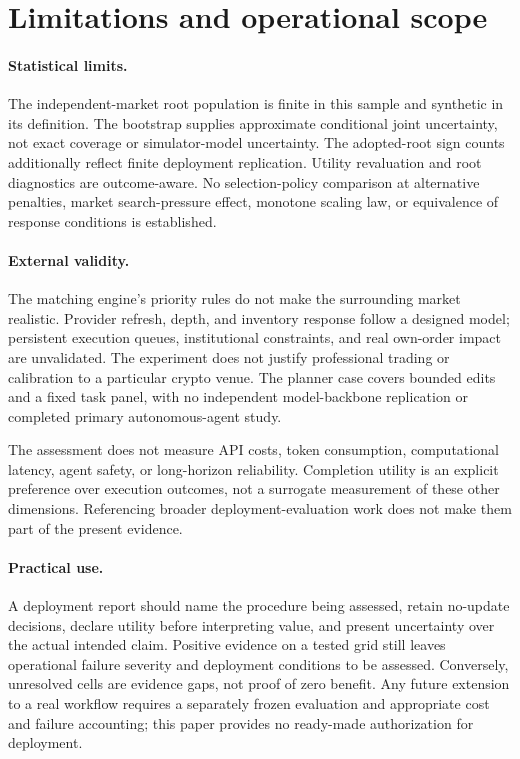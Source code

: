 \documentclass[10pt,letterpaper]{article}
\begin{document}
\section{Limitations and operational scope}
\paragraph{Statistical limits.}
The independent-market root population is finite in this sample and synthetic in its definition. The bootstrap supplies approximate conditional joint uncertainty, not exact coverage or simulator-model uncertainty. The adopted-root sign counts additionally reflect finite deployment replication. Utility revaluation and root diagnostics are outcome-aware. No selection-policy comparison at alternative penalties, market search-pressure effect, monotone scaling law, or equivalence of response conditions is established.

\paragraph{External validity.}
The matching engine's priority rules do not make the surrounding market realistic. Provider refresh, depth, and inventory response follow a designed model; persistent execution queues, institutional constraints, and real own-order impact are unvalidated. The experiment does not justify professional trading or calibration to a particular crypto venue. The planner case covers bounded edits and a fixed task panel, with no independent model-backbone replication or completed primary autonomous-agent study.

The assessment does not measure API costs, token consumption, computational latency, agent safety, or long-horizon reliability. Completion utility is an explicit preference over execution outcomes, not a surrogate measurement of these other dimensions. Referencing broader deployment-evaluation work does not make them part of the present evidence.

\paragraph{Practical use.}
A deployment report should name the procedure being assessed, retain no-update decisions, declare utility before interpreting value, and present uncertainty over the actual intended claim. Positive evidence on a tested grid still leaves operational failure severity and deployment conditions to be assessed. Conversely, unresolved cells are evidence gaps, not proof of zero benefit. Any future extension to a real workflow requires a separately frozen evaluation and appropriate cost and failure accounting; this paper provides no ready-made authorization for deployment.
\end{document}
